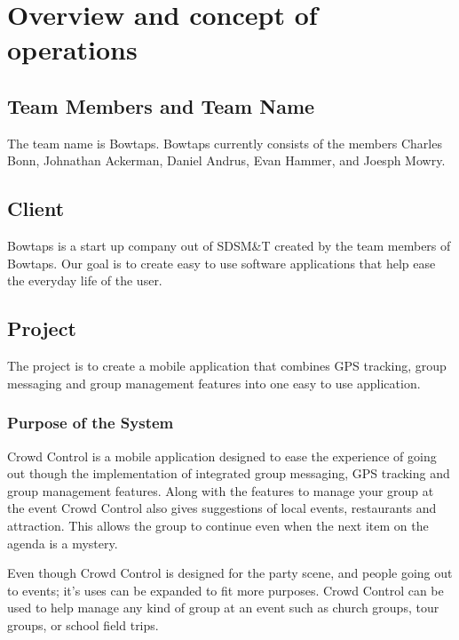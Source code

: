 

\chapter{Overview and concept of operations}


\section{Team Members and Team Name}

The team name is Bowtaps. Bowtaps currently consists of the members Charles Bonn, Johnathan Ackerman, Daniel Andrus, Evan Hammer, and Joesph Mowry.

\section{Client}
Bowtaps is a start up company out of SDSM\&T created by the team members of Bowtaps. Our goal is to create easy to use software applications that help ease the everyday life of the user.

\section{Project}
The project is to create a mobile application that combines GPS tracking, group messaging and group management features into one easy to use application.

\subsection{Purpose of the System}
Crowd Control is a mobile application designed to ease the experience of going out though the implementation of integrated group messaging, GPS tracking and group management features. Along with the features to manage your group at the event Crowd Control also gives suggestions of local events, restaurants and attraction. This allows the group to continue even when the next item on the agenda is a mystery. 


Even though Crowd Control is designed for the party scene, and people going out to events; it's uses can be expanded to fit more purposes. Crowd Control can be used to help manage any kind of group at an event such as church groups, tour groups, or school field trips.

